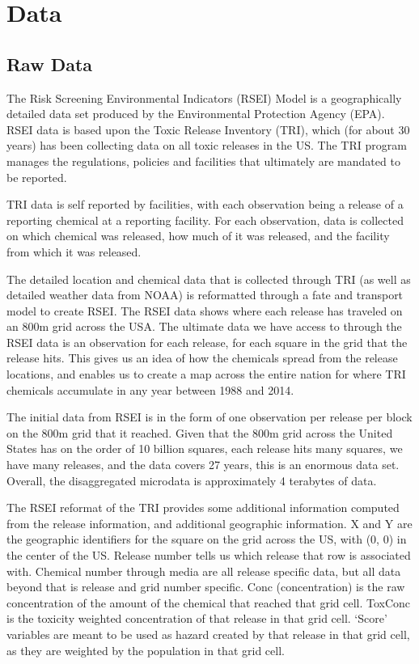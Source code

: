 \documentclass[12pt,twoside]{dukestatscithesis}
\theoremstyle{definition}
\theoremstyle{definition}
\theoremstyle{definition}
\theoremstyle{remark}
\begin{document}
\chapter{Data}\label{data}

\section{Raw Data}\label{raw-data}

The Risk Screening Environmental Indicators (RSEI) Model is a
geographically detailed data set produced by the Environmental
Protection Agency (EPA). RSEI data is based upon the Toxic Release
Inventory (TRI), which (for about 30 years) has been collecting data on
all toxic releases in the US. The TRI program manages the regulations,
policies and facilities that ultimately are mandated to be reported.

TRI data is self reported by facilities, with each observation being a
release of a reporting chemical at a reporting facility. For each
observation, data is collected on which chemical was released, how much
of it was released, and the facility from which it was released.

The detailed location and chemical data that is collected through TRI
(as well as detailed weather data from NOAA) is reformatted through a
fate and transport model to create RSEI. The RSEI data shows where each
release has traveled on an 800m grid across the USA. The ultimate data
we have access to through the RSEI data is an observation for each
release, for each square in the grid that the release hits. This gives
us an idea of how the chemicals spread from the release locations, and
enables us to create a map across the entire nation for where TRI
chemicals accumulate in any year between 1988 and 2014.

The initial data from RSEI is in the form of one observation per release
per block on the 800m grid that it reached. Given that the 800m grid
across the United States has on the order of 10 billion squares, each
release hits many squares, we have many releases, and the data covers 27
years, this is an enormous data set. Overall, the disaggregated
microdata is approximately 4 terabytes of data.

The RSEI reformat of the TRI provides some additional information
computed from the release information, and additional geographic
information. X and Y are the geographic identifiers for the square on
the grid across the US, with (0, 0) in the center of the US. Release
number tells us which release that row is associated with. Chemical
number through media are all release specific data, but all data beyond
that is release and grid number specific. Conc (concentration) is the
raw concentration of the amount of the chemical that reached that grid
cell. ToxConc is the toxicity weighted concentration of that release in
that grid cell. `Score' variables are meant to be used as hazard created
by that release in that grid cell, as they are weighted by the
population in that grid cell.
\end{document}
